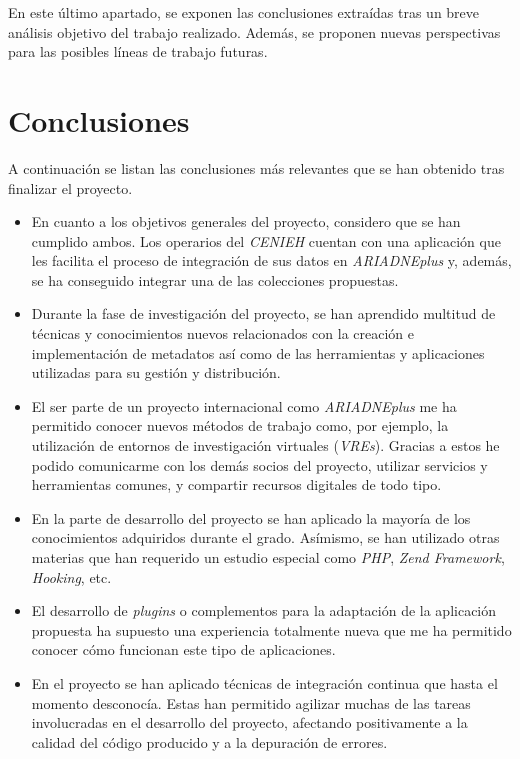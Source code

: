 
En este último apartado, se exponen las conclusiones extraídas tras un
breve análisis objetivo del trabajo realizado. Además, se proponen
nuevas perspectivas para las posibles líneas de trabajo futuras.

\section{Conclusiones}

A continuación se listan las conclusiones más relevantes que se han
obtenido tras finalizar el proyecto.

\begin{itemize}
\tightlist
\item
  En cuanto a los objetivos generales del proyecto, considero que se han
  cumplido ambos. Los operarios del \emph{CENIEH} cuentan con una
  aplicación que les facilita el proceso de integración de sus datos en
  \emph{ARIADNEplus} y, además, se ha conseguido integrar una de las
  colecciones propuestas.
\item
  Durante la fase de investigación del proyecto, se han aprendido
  multitud de técnicas y conocimientos nuevos relacionados con la
  creación e implementación de metadatos así como de las 
  herramientas y aplicaciones utilizadas para su gestión y distribución.
\item
  El ser parte de un proyecto internacional como \emph{ARIADNEplus} me
  ha permitido conocer nuevos métodos de trabajo como, por ejemplo, la
  utilización de entornos de investigación virtuales (\emph{VREs}).
  Gracias a estos he podido comunicarme con los demás socios del
  proyecto, utilizar servicios y herramientas comunes, y compartir
  recursos digitales de todo tipo.
\item
  En la parte de desarrollo del proyecto se han aplicado la mayoría de
  los conocimientos adquiridos durante el grado. Asímismo, se han
  utilizado otras materias que han requerido un estudio especial como
  \emph{PHP}, \emph{Zend Framework}, \emph{Hooking}, etc.
\item
  El desarrollo de \emph{plugins} o complementos para la adaptación de
  la aplicación propuesta ha supuesto una experiencia totalmente nueva
  que me ha permitido conocer cómo funcionan este tipo de aplicaciones.
\item
  En el proyecto se han aplicado técnicas de integración continua que hasta
  el momento desconocía. Estas han permitido agilizar muchas de las tareas involucradas en el
  desarrollo del proyecto, afectando positivamente a la calidad del código producido y a la
  depuración de errores.
\end{itemize}

